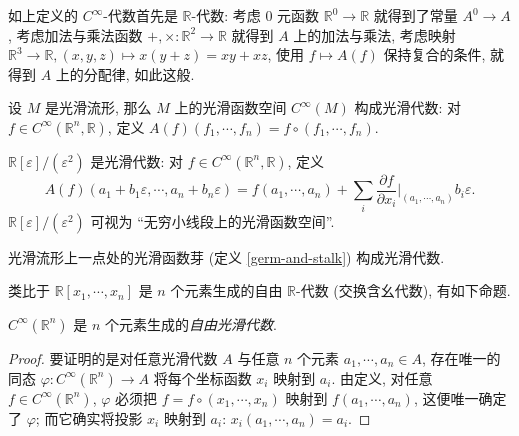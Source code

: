 \begin{remark}
	[label={remark-smooth-algebra-R-algebra}]
	{}
	如上定义的 $C^\infty$-代数首先是 $\mathbb{R}$-代数: 考虑 $0$ 元函数 $\mathbb{R}^0\to \mathbb{R}$ 就得到了常量 $A^0\to A$,
	考虑加法与乘法函数 $+,\times\colon \mathbb{R}^2\to \mathbb{R}$ 就得到 $A$ 上的加法与乘法, 考虑映射 $\mathbb{R}^3\to \mathbb{R}, (x,y,z)\mapsto x(y+z) = xy+xz$, 使用 $f\mapsto A(f)$ 保持复合的条件, 就得到 $A$ 上的分配律, 如此这般.
\end{remark}

\begin{example}
	{}
	设 $M$ 是光滑流形, 那么 $M$ 上的光滑函数空间 $C^\infty (M)$ 构成光滑代数: 对 $f\in C^\infty (\mathbb{R}^n,\mathbb{R})$, 定义 $A(f)(f_1,\cdots,f_n)=f\circ (f_1,\cdots,f_n)$.
\end{example}

\begin{example}
	{}
	$\mathbb{R}[\varepsilon]/(\varepsilon^2)$ 是光滑代数: 对 $f\in C^\infty (\mathbb{R}^n,\mathbb{R})$, 定义 $$
	A(f)(a_1+b_1 \varepsilon,\cdots,a_n+b_n \varepsilon)
	=f(a_1,\cdots,a_n)
	+\sum_i \frac{\partial f}{\partial x_i}\Big|_{(a_1,\cdots,a_n)} b_i \varepsilon.$$
	$\mathbb{R}[\varepsilon]/(\varepsilon^2)$ 可视为 ``无穷小线段上的光滑函数空间''.
\end{example}

\begin{example}
	{}
	光滑流形上一点处的光滑函数芽 (定义 \ref{germ-and-stalk}) 构成光滑代数.
\end{example}

类比于 $\mathbb{R}[x_1,\cdots,x_n]$ 是 $n$ 个元素生成的自由 $\mathbb{R}$-代数 (交换含幺代数), 有如下命题.

\begin{prop}
	[label={freely-generated-smooth-algebra}]
	{}
	$C^\infty (\mathbb{R}^n)$ 是 $n$ 个元素生成的\emph{自由光滑代数}.
\end{prop}

\begin{proof}
	要证明的是对任意光滑代数 $A$ 与任意 $n$ 个元素 $a_1,\cdots,a_n \in A$,
	存在唯一的同态 $\varphi\colon C^\infty (\mathbb{R}^n) \to A$ 将每个坐标函数 $x_i$ 映射到 $a_i$.
	由定义, 对任意 $f\in C^\infty (\mathbb{R}^n)$,
	$\varphi$ 必须把 $f = f\circ (x_1,\cdots,x_n)$ 映射到 $f(a_1,\cdots,a_n)$, 这便唯一确定了 $\varphi$; 而它确实将投影 $x_i$ 映射到 $a_i$: $x_i(a_1,\cdots,a_n) = a_i$.
\end{proof}

